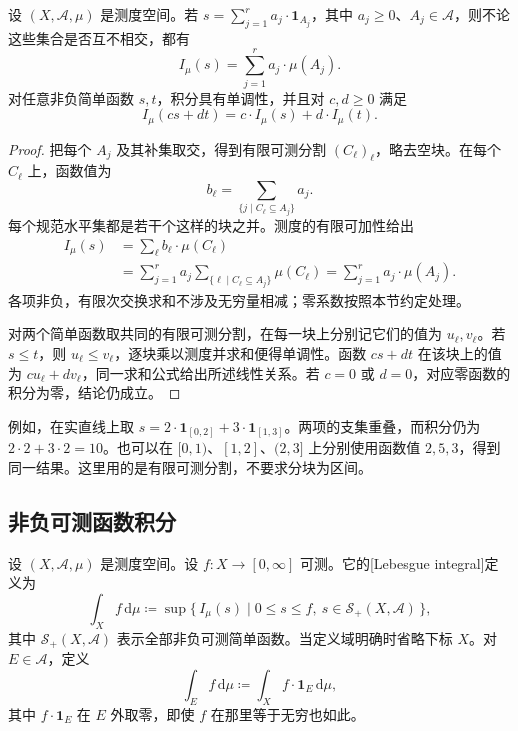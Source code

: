 \begin{proposition}\label{b1:prop:simple-integral-well-defined}
设 \((X,\mathcal A,\mu)\) 是测度空间。若 \(s=\sum_{j=1}^{r}a_j\cdot\mathbf1_{A_j}\)，其中 \(a_j\geq0\)、\(A_j\in\mathcal A\)，则不论这些集合是否互不相交，都有
\[
I_\mu(s)=\sum_{j=1}^{r}a_j\cdot\mu(A_j).
\]
对任意非负简单函数 \(s,t\)，积分具有单调性，并且对 \(c,d\geq0\) 满足
\[
I_\mu(cs+dt)=c\cdot I_\mu(s)+d\cdot I_\mu(t).
\]
\end{proposition}
\begin{proof}
把每个 \(A_j\) 及其补集取交，得到有限可测分割 \((C_\ell)_\ell\)，略去空块。在每个 \(C_\ell\) 上，函数值为
\[
b_\ell=\sum_{\{j\mid C_\ell\subseteq A_j\}}a_j.
\]
每个规范水平集都是若干个这样的块之并。测度的有限可加性给出
\[
\begin{aligned}
I_\mu(s)
&=\sum_\ell b_\ell\cdot \mu(C_\ell)\\
&=\sum_{j=1}^{r}a_j\sum_{\{\ell\mid C_\ell\subseteq A_j\}}\mu(C_\ell)
=\sum_{j=1}^{r}a_j\cdot\mu(A_j).
\end{aligned}
\]
各项非负，有限次交换求和不涉及无穷量相减；零系数按照本节约定处理。

对两个简单函数取共同的有限可测分割，在每一块上分别记它们的值为 \(u_\ell,v_\ell\)。若 \(s\leq t\)，则 \(u_\ell\leq v_\ell\)，逐块乘以测度并求和便得单调性。函数 \(cs+dt\) 在该块上的值为 \(cu_\ell+dv_\ell\)，同一求和公式给出所述线性关系。若 \(c=0\) 或 \(d=0\)，对应零函数的积分为零，结论仍成立。
\end{proof}

例如，在实直线上取 \(s=2\cdot\mathbf1_{[0,2]}+3\cdot\mathbf1_{[1,3]}\)。两项的支集重叠，而积分仍为 \(2\cdot2+3\cdot2=10\)。也可以在 \([0,1)\)、\([1,2]\)、\((2,3]\) 上分别使用函数值 \(2,5,3\)，得到同一结果。这里用的是有限可测分割，不要求分块为区间。

\subsection{非负可测函数积分}
\label{b1:subsec:050102}

\begin{definition}\label{b1:def:nonnegative-integral}
设 \((X,\mathcal A,\mu)\) 是测度空间。设 \(f:X\rightarrow[0,\infty]\) 可测。它的[Lebesgue integral]定义为
\[
\int_X f\,\mathrm d\mu
\coloneqq\sup\{\,I_\mu(s)\mid 0\leq s\leq f,\ s\in\mathcal S_+(X,\mathcal A)\,\},
\]
其中 \(\mathcal S_+(X,\mathcal A)\) 表示全部非负可测简单函数。当定义域明确时省略下标 \(X\)。对 \(E\in\mathcal A\)，定义
\[
\int_E f\,\mathrm d\mu\coloneqq\int_X f\cdot\mathbf1_E\,\mathrm d\mu,
\]
其中 \(f\cdot\mathbf1_E\) 在 \(E\) 外取零，即使 \(f\) 在那里等于无穷也如此。
\end{definition}

